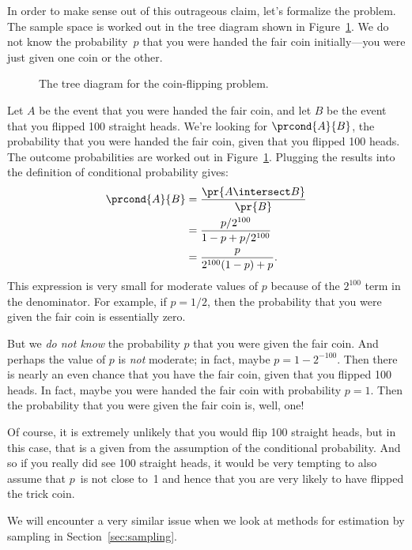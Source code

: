 In order to make sense out of this outrageous claim, let's formalize
the problem.  The sample space is worked out in the tree diagram shown
in Figure~\ref{fig:15C2}.  We do not know the probability~$p$ that you
were handed the fair coin initially---you were just given one coin or
the other.
%
\begin{figure}[h]


\caption{The tree diagram for the coin-flipping problem.}

\label{fig:15C2}

\end{figure}
%
Let $A$ be the event that you were handed the fair coin, and let $B$
be the event that you flipped 100 straight heads.  We're looking
for $\prcond{A}{B}$, the probability that you were handed the fair
coin, given that you flipped 100 heads.  The outcome probabilities are
worked out in Figure~\ref{fig:15C2}.  Plugging the results into the
definition of conditional probability gives:
%
\begin{align*}
\prcond{A}{B}	& = \frac{\pr{A \intersect B}}{\pr{B}} \\%
		& = \frac{p / 2^{100}}{1 - p + p / 2^{100}} \\%
		& = \frac{p}{2^{100} (1 - p) + p}.
\end{align*}
%
This expression is very small for moderate values of $p$ because of
the $2^{100}$ term in the denominator.  For example, if $p = 1/2$,
then the probability that you were given the fair coin is essentially
zero.

But we \emph{do not know} the probability $p$ that you were given
the fair coin.  And perhaps the value of $p$ is \emph{not} moderate;
in fact, maybe $p = 1 - 2^{-100}$.  Then there is nearly an even
chance that you have the fair coin, given that you flipped 100 heads.
In fact, maybe you were handed the fair coin with probability $p = 1$.
Then the probability that you were given the fair coin is, well, one!

Of course, it is extremely unlikely that you would flip 100 straight
heads, but in this case, that is a given from the assumption of the
conditional probability.  And so if you really did see 100 straight
heads, it would be very tempting to also assume that $p$~is not close
to~1 and hence that you are very likely to have flipped the trick
coin.

We will encounter a very similar issue when we look at methods for
estimation by sampling in Section~\ref{sec:sampling}.
\fi

